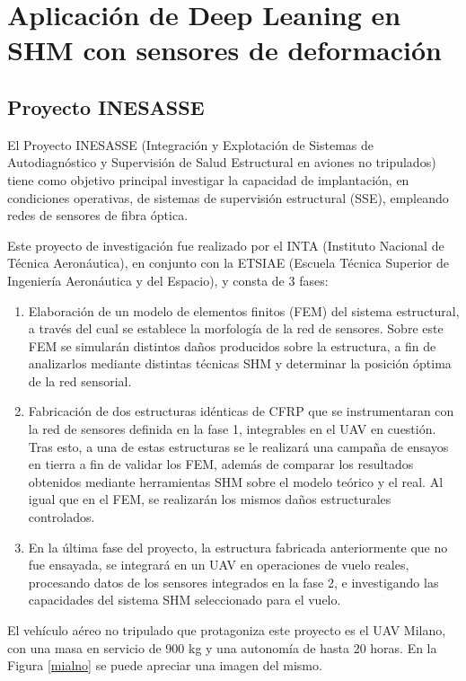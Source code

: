 \chapter{Aplicación de Deep Leaning en SHM con sensores de deformación}%



\section{Proyecto INESASSE}

El Proyecto INESASSE (Integración y Explotación de Sistemas de Autodiagnóstico y Supervisión de Salud Estructural en aviones no tripulados) tiene como objetivo principal investigar la capacidad de implantación, en condiciones operativas, de sistemas de supervisión estructural (SSE), empleando redes de sensores de fibra óptica.

Este proyecto de investigación fue realizado por el INTA (Instituto Nacional de Técnica Aeronáutica), en conjunto con la ETSIAE (Escuela Técnica Superior de Ingeniería Aeronáutica y del Espacio), y consta de 3 fases:

\begin{enumerate}
    \item Elaboración de un modelo de elementos finitos (FEM) del sistema estructural, a través del cual se establece la morfología de la red de sensores. Sobre este FEM se simularán distintos daños producidos sobre la estructura, a fin de analizarlos mediante distintas técnicas SHM y determinar la posición óptima de la red sensorial.
    \item Fabricación de dos estructuras idénticas de CFRP que se instrumentaran con la red de sensores definida en la fase 1, integrables en el UAV en cuestión. Tras esto, a una de estas estructuras se le realizará una campaña de ensayos en tierra a fin de validar los FEM, además de comparar los resultados obtenidos mediante herramientas SHM sobre el modelo teórico y el real. Al igual que en el FEM, se realizarán los mismos daños estructurales controlados.
    \item  En la última fase del proyecto, la estructura fabricada anteriormente que no fue ensayada, se integrará en un UAV en operaciones de vuelo reales, procesando datos de los sensores integrados en la fase 2, e investigando las capacidades del sistema SHM seleccionado para el vuelo.
\end{enumerate}

El vehículo aéreo no tripulado que protagoniza este proyecto es el UAV Milano, con una masa en servicio de 900 kg y una autonomía de hasta 20 horas. En la Figura \ref{mialno} se puede apreciar una imagen del mismo.

